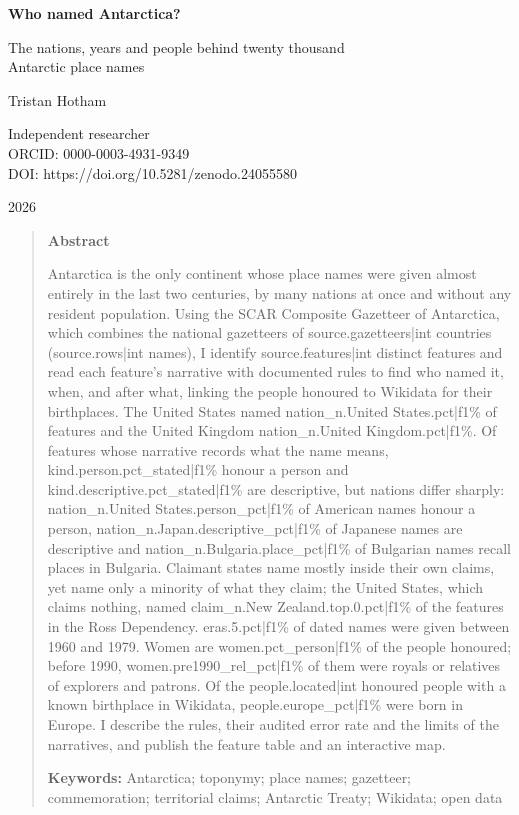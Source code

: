 \documentclass[11pt,a4paper]{article}
\begin{document}
\begin{center}
{\Large\bfseries Who named Antarctica?\par}
\vspace{0.4em}
{\large The nations, years and people behind twenty thousand\\Antarctic place names\par}
\vspace{1.2em}
{\large Tristan Hotham\par}
\vspace{0.3em}
{\small Independent researcher\\
ORCID: 0000-0003-4931-9349\\
DOI: https://doi.org/10.5281/zenodo.24055580\par}
\vspace{0.8em}
2026
\end{center}

\begin{quote}
\small
\begin{center}\textbf{Abstract}\end{center}
Antarctica is the only continent whose place names were given almost entirely in the last two centuries, by many nations at once and without any resident population. Using the SCAR Composite Gazetteer of Antarctica, which combines the national gazetteers of {{source.gazetteers|int}} countries ({{source.rows|int}} names), I identify {{source.features|int}} distinct features and read each feature's narrative with documented rules to find who named it, when, and after what, linking the people honoured to Wikidata for their birthplaces. The United States named {{nation_n.United States.pct|f1}}\% of features and the United Kingdom {{nation_n.United Kingdom.pct|f1}}\%. Of features whose narrative records what the name means, {{kind.person.pct_stated|f1}}\% honour a person and {{kind.descriptive.pct_stated|f1}}\% are descriptive, but nations differ sharply: {{nation_n.United States.person_pct|f1}}\% of American names honour a person, {{nation_n.Japan.descriptive_pct|f1}}\% of Japanese names are descriptive and {{nation_n.Bulgaria.place_pct|f1}}\% of Bulgarian names recall places in Bulgaria. Claimant states name mostly inside their own claims, yet name only a minority of what they claim; the United States, which claims nothing, named {{claim_n.New Zealand.top.0.pct|f1}}\% of the features in the Ross Dependency. {{eras.5.pct|f1}}\% of dated names were given between 1960 and 1979. Women are {{women.pct_person|f1}}\% of the people honoured; before 1990, {{women.pre1990_rel_pct|f1}}\% of them were royals or relatives of explorers and patrons. Of the {{people.located|int}} honoured people with a known birthplace in Wikidata, {{people.europe_pct|f1}}\% were born in Europe. I describe the rules, their audited error rate and the limits of the narratives, and publish the feature table and an interactive map.

\textbf{Keywords:} Antarctica; toponymy; place names; gazetteer; commemoration; territorial claims; Antarctic Treaty; Wikidata; open data
\end{quote}
\end{document}

